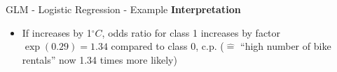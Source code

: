 \documentclass[11pt,compress,t,notes=noshow, aspectratio=169, xcolor=table]{beamer}
\begin{document}
\begin{frame}{GLM - Logistic Regression - Example}
\textbf{Interpretation}
\begin{itemize}
    \item If  increases by 1$^\circ C$, odds ratio for class 1 increases by factor $\exp (0.29) = 1.34$ compared to class 0, c.p. ($\hat =$ ``high number of bike rentals'' now 1.34 times more likely)
\end{itemize}
\end{frame}


\endlecture
\end{document}
